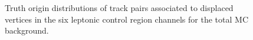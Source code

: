 \begin{figure}[!ht]
    \caption{Truth origin distributions of track pairs associated to displaced vertices in the six leptonic control region channels for the total MC background.}
    \label{fig:truth_origin_CR}
\end{figure}

